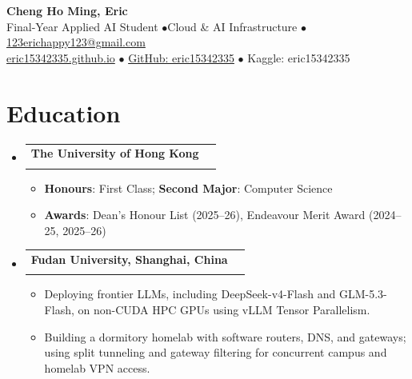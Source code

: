 \documentclass[a4paper,10pt]{article}
\makeatletter
\newcommand{\iconlink}[3]{
  \href{#2}{#1~#3}
}
\newcommand{\resumeItem}[1]{
  \item\small{#1}
}
\newcommand{\resumeSubheading}[4]{
  \vspace{-2pt}\item
    \begin{tabular*}{0.97\textwidth}[t]{@{}l@{\extracolsep{\fill}}r@{}}
      \textbf{#1} & \small#2 \\
      \textlight{\small#3} & \textlight{\small#4} \\
    \end{tabular*}\vspace{-6pt}
}
\newcommand{\resumeSubHeadingListStart}{\begin{itemize}[leftmargin=0.15in, label={}, itemsep=1pt]}
\newcommand{\resumeSubHeadingListEnd}{\end{itemize}}
\newcommand{\resumeItemListStart}{
  \begin{itemize}[
    leftmargin=0.2in,
    rightmargin=0.2in,
    itemindent=0pt,
    labelsep=0.1in,
    itemsep=1pt,
    parsep=0pt,
    topsep=3pt,
    label={\raisebox{2pt}{\tiny$\bullet$}}
  ]
}
\newcommand{\resumeItemListEnd}{\end{itemize}}
\newcommand{\contactSep}{\hspace{0.3em}$\bullet$\hspace{0.45em}}
\makeatother
\begin{document}
\begin{center}
  \textbf{\Huge Cheng Ho Ming, Eric} \\ \vspace{3pt}
  \small Final-Year Applied AI Student \contactSep Cloud \& AI Infrastructure \contactSep
  \href{mailto:123erichappy123@gmail.com}{123erichappy123@gmail.com} \\
  \href{https://eric15342335.github.io/}{eric15342335.github.io} \contactSep
  \href{https://github.com/eric15342335}{GitHub: eric15342335} \contactSep
  Kaggle: eric15342335
\end{center}


\section{Education}
  \resumeSubHeadingListStart
    \resumeSubheading
      {The University of Hong Kong}{}
      {Bachelor of Arts and Science in Applied Artificial Intelligence (BASc(AppliedAI))}{Sep 2023 -- Jul 2027}
      \resumeItemListStart
        \resumeItem{\textbf{Honours}: First Class; \textbf{Second Major}: Computer Science}
        \resumeItem{\textbf{Awards}: Dean's Honour List (2025--26), Endeavour Merit Award (2024--25, 2025--26)}
      \resumeItemListEnd
    \resumeSubheading
      {Fudan University, Shanghai, China}{}
      {Exchange Student in Computer Science and Technology}{Sep 2026 -- Jan 2027}
      \resumeItemListStart
        \resumeItem{Deploying frontier LLMs, including DeepSeek-v4-Flash and GLM-5.3-Flash, on non-CUDA HPC GPUs using vLLM Tensor Parallelism.}
        \resumeItem{Building a dormitory homelab with software routers, DNS, and gateways; using split tunneling and gateway filtering for concurrent campus and homelab VPN access.}
      \resumeItemListEnd
  \resumeSubHeadingListEnd
\end{document}
